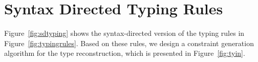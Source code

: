 \section{Syntax Directed Typing Rules}




Figure~\ref{fig:sdtyping} shows the syntax-directed version of the
typing rules in Figure~\ref{fig:typingrules}.  Based on these rules,
we design a constraint generation algorithm for the type
reconstruction, which is presented in Figure~\ref{fig:tyin}.

